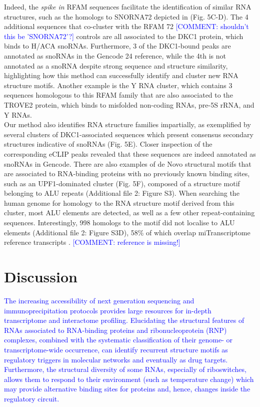\documentclass{bmcart}
\begin{document}
Indeed, the \textit{spike in} RFAM sequences facilitate the identification of similar RNA structures, 
such as the homologs to SNORNA72 depicted in (Fig. 5C-D). The 4 additional sequences that 
co-cluster with the RFAM 72 \textcolor{blue} {[COMMENT: shouldn't this be 'SNORNA72'?]} controls are all associated to the DKC1 protein, which binds to H/ACA snoRNAs. 
Furthermore, 3 of the DKC1-bound peaks are annotated as snoRNAs in the Gencode 24 reference, 
while the 4th is not annotated as a snoRNA despite strong sequence and structure similarity, 
highlighting how this method can successfully identify and cluster new RNA structure motifs. 
Another example is the Y RNA cluster, which contains 3 sequences homologous to this RFAM family 
that are also associated to the TROVE2 protein, which binds to misfolded non-coding RNAs, 
pre-5S rRNA, and Y RNAs.\\

Our method also identifies RNA structure families impartially, 
as exemplified by several clusters of DKC1-associated sequences which present
consensus secondary structures indicative of snoRNAs (Fig. 5E). 
Closer inspection of the corresponding eCLIP peaks revealed that these sequences
are indeed annotated as snoRNAs in Gencode. There are also examples of de Novo 
structural motifs that are associated to RNA-binding proteins with no 
previously known binding sites, such as an UPF1-dominated cluster 
(Fig. 5F), composed of a structure motif belonging to ALU repeats 
(Additional file 2: Figure S3). When searching the human genome for 
homology to the RNA structure motif derived from this cluster, 
most ALU elements are detected, as well as a few other repeat-containing sequences. 
Interestingly, 998 homologs to the motif did not localise to ALU elements (Additional file 2: Figure S3D), 
58\% of which overlap miTranscriptome reference transcripts \cite{iyer2015landscape}. \textcolor{blue} {[COMMENT: reference is missing!]} 


\section*{Discussion}

\textcolor{blue} { 
The increasing accessibility of next generation sequencing and immunoprecipitation protocols provides large resources for in-depth transcriptome and interactome profiling. Elucidating the
structural features of RNAs associated to RNA-binding proteins and
ribonucleoprotein (RNP) complexes, combined with the systematic classification of
their genome- or transcriptome-wide occurrence, can identify recurrent structure motifs as regulatory triggers in molecular networks and eventually as drug targets.
Furthermore, the structural diversity of some RNAs,
especially of riboswitches, allows them to respond to their environment (such
as temperature change) which may provide alternative binding sites for
proteins and, hence, changes inside the regulatory circuit. \\
}
\end{document}
